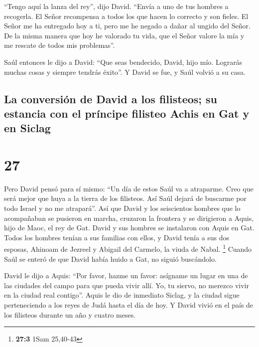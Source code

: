  ``Tengo aquí la lanza del rey'', dijo David. ``Envía a
uno de tus hombres a recogerla.  El Señor recompensa a
todos los que hacen lo correcto y son fieles. El Señor me ha entregado
hoy a ti, pero me he negado a dañar al ungido del Señor. 
De la misma manera que hoy he valorado tu vida, que el Señor valore la
mía y me rescate de todos mis problemas''.

 Saúl entonces le dijo a David: ``Que seas bendecido,
David, hijo mío. Lograrás muchas cosas y siempre tendrás éxito''. Y
David se fue, y Saúl volvió a su casa.

\hypertarget{la-conversiuxf3n-de-david-a-los-filisteos-su-estancia-con-el-pruxedncipe-filisteo-achis-en-gat-y-en-siclag}{%
\subsection{La conversión de David a los filisteos; su estancia con el
príncipe filisteo Achis en Gat y en
Siclag}\label{la-conversiuxf3n-de-david-a-los-filisteos-su-estancia-con-el-pruxedncipe-filisteo-achis-en-gat-y-en-siclag}}

\hypertarget{section-26}{%
\section{27}\label{section-26}}

 Pero David pensó para sí mismo: ``Un día de estos Saúl va
a atraparme. Creo que será mejor que huya a la tierra de los filisteos.
Así Saúl dejará de buscarme por todo Israel y no me atrapará''.
 Así que David y los seiscientos hombres que lo
acompañaban se pusieron en marcha, cruzaron la frontera y se dirigieron
a Aquis, hijo de Maoc, el rey de Gat.  David y sus hombres
se instalaron con Aquis en Gat. Todos los hombres tenían a sus familias
con ellos, y David tenía a sus dos esposas, Ahinoam de Jezreel y Abigail
del Carmelo, la viuda de Nabal. \footnote{\textbf{27:3} 1Sam 25,40-43}
 Cuando Saúl se enteró de que David había huido a Gat, no
siguió buscándolo.

 David le dijo a Aquis: ``Por favor, hazme un favor:
asígname un lugar en una de las ciudades del campo para que pueda vivir
allí. Yo, tu siervo, no merezco vivir en la ciudad real contigo''.
 Aquis le dio de inmediato Siclag, y la ciudad sigue
perteneciendo a los reyes de Judá hasta el día de hoy.  Y
David vivió en el país de los filisteos durante un año y cuatro meses.

